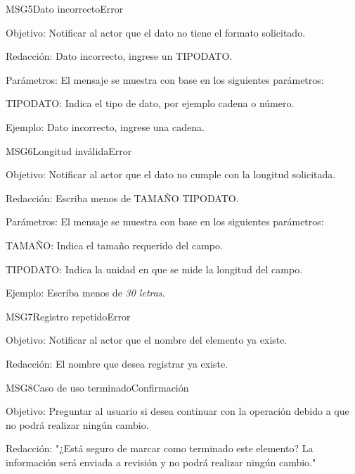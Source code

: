 \begin{mensaje}{MSG5}{Dato incorrecto}{Error}
    \item[Objetivo:] Notificar al actor que el dato no tiene el formato solicitado.
    \item[Redacción:] Dato incorrecto, ingrese un TIPODATO.
    \item[Parámetros:] El mensaje se muestra con base en los siguientes parámetros:
    \begin{Citemize}
	\item TIPODATO: Indica el tipo de dato, por ejemplo cadena o número.
    \end{Citemize}
    \item[Ejemplo:] Dato incorrecto, ingrese una cadena.
\end{mensaje}

\begin{mensaje}{MSG6}{Longitud inválida}{Error}
    \item[Objetivo:] Notificar al actor que el dato no cumple con la longitud solicitada.
    \item[Redacción:] Escriba menos de TAMAÑO TIPODATO.
    \item[Parámetros:] El mensaje se muestra con base en los siguientes parámetros:
    \begin{Citemize}
	\item TAMAÑO: Indica el tamaño requerido del campo.
	\item TIPODATO: Indica la unidad en que se mide la longitud del campo.
    \end{Citemize}
    \item[Ejemplo:] Escriba menos de {\em 30 letras}.
\end{mensaje}

\begin{mensaje}{MSG7}{Registro repetido}{Error}
    \item[Objetivo:] Notificar al actor que el nombre del elemento ya existe.
    \item[Redacción:] El nombre que desea registrar ya existe.
\end{mensaje}

\begin{mensaje}{MSG8}{Caso de uso terminado}{Confirmación}
    \item[Objetivo:] Preguntar al usuario si desea continuar con la operación debido a que no podrá realizar ningún cambio.
    \item[Redacción:] "¿Está seguro de marcar como terminado este elemento? La información será enviada a revisión y no podrá realizar ningún cambio."
\end{mensaje}

